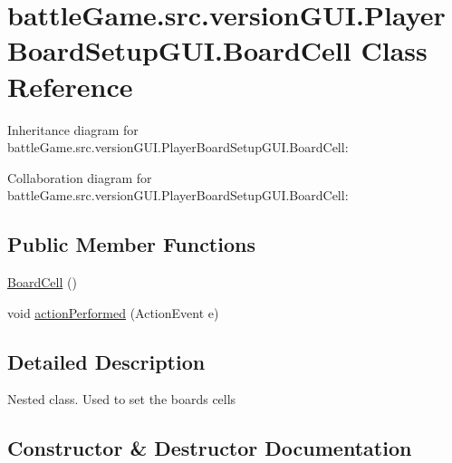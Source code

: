 \hypertarget{classbattleGame_1_1src_1_1versionGUI_1_1PlayerBoardSetupGUI_1_1BoardCell}{}\section{battle\+Game.\+src.\+version\+G\+U\+I.\+Player\+Board\+Setup\+G\+U\+I.\+Board\+Cell Class Reference}
\label{classbattleGame_1_1src_1_1versionGUI_1_1PlayerBoardSetupGUI_1_1BoardCell}


Inheritance diagram for battle\+Game.\+src.\+version\+G\+U\+I.\+Player\+Board\+Setup\+G\+U\+I.\+Board\+Cell\+:


Collaboration diagram for battle\+Game.\+src.\+version\+G\+U\+I.\+Player\+Board\+Setup\+G\+U\+I.\+Board\+Cell\+:
\subsection*{Public Member Functions}
\begin{DoxyCompactItemize}
\item 
\hyperlink{classbattleGame_1_1src_1_1versionGUI_1_1PlayerBoardSetupGUI_1_1BoardCell_aa7c3d45cf9050dba20ee2aad2fbb8d7d}{Board\+Cell} ()
\item 
void \hyperlink{classbattleGame_1_1src_1_1versionGUI_1_1PlayerBoardSetupGUI_1_1BoardCell_aa6007b06de6762ce0a7b422c6ded9009}{action\+Performed} (Action\+Event e)
\end{DoxyCompactItemize}


\subsection{Detailed Description}
Nested class. Used to set the board\textquotesingle{}s cells 

\subsection{Constructor \& Destructor Documentation}
